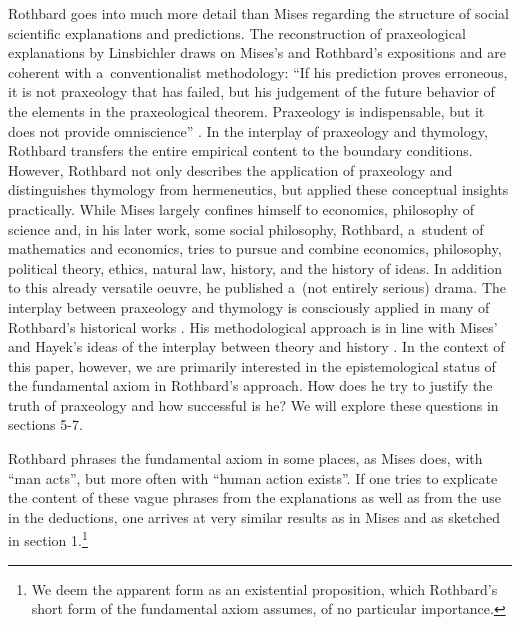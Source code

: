Rothbard goes into much more detail than Mises regarding the structure of social scientific explanations and predictions. The reconstruction of praxeological explanations by Linsbichler 
\parencites*[][pp.52–55]{linsbichler_was_2017}[see also][]{gordon_economics_1999} %
 draws on Mises's and Rothbard's expositions and are coherent with a~conventionalist methodology: ``If his prediction proves erroneous, it is not praxeology that has failed, but his judgement of the future behavior of the elements in the praxeological theorem. Praxeology is indispensable, but it does not provide omniscience'' 
\parencite[][p.945]{rothbard_praxeology_1951}. %
 In the interplay of praxeology and thymology, Rothbard transfers the entire empirical content to the boundary conditions. However, Rothbard 
\parencite*[][]{rothbard_hermeneutical_1989} %
 not only describes the application of praxeology and distinguishes thymology from hermeneutics, but applied these conceptual insights practically. While Mises largely confines himself to economics, philosophy of science and, in his later work, some social philosophy, Rothbard, a~student of mathematics and economics, tries to pursue and combine economics, philosophy, political theory, ethics, natural law, history, and the history of ideas. In addition to this already versatile oeuvre, he published a~(not entirely serious) drama. The interplay between praxeology and thymology is consciously applied in many of Rothbard's historical works 
\parencites[][]{rothbard_panic_1962}[][]{rothbard_americas_1963}[][]{rothbard_americas_2000}[][]{rothbard_conceived_1975}[][]{rothbard_conceived_2011}[][]{rothbard_origins_1996}[][]{rothbard_war_2012}[][]{rothbard_history_2020}. %
 His methodological approach is in line with Mises' and Hayek's ideas of the interplay between theory and history 
\parencites[][]{white_methodology_1977}[][p.26]{white_methodology_2003}. %
 In the context of this paper, however, we are primarily interested in the epistemological status of the fundamental axiom in Rothbard's approach. How does he try to justify the truth of praxeology and how successful is he? We will explore these questions in sections 5-7.



Rothbard phrases the fundamental axiom in some places, as Mises does, with ``man acts'', but more often with ``human action exists''. If one tries to explicate the content of these vague phrases from the explanations as well as from the use in the deductions, one arrives at very similar results as in Mises and as sketched in section 1.\footnote{We deem the apparent form as an existential proposition, which Rothbard's short form of the fundamental axiom assumes, of no particular importance.}



